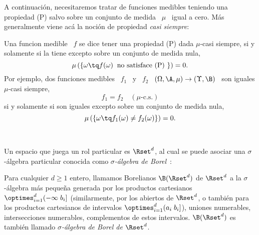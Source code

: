 A  continuaci\'on,  necesitaremos  tratar  de funciones  medibles  teniendo  una
propiedad (P) salvo sobre  un conjunto de medida \ $\mu$ \  igual a cero.  M\'as
generalmente viene ac\'a la noci\'on de propiedad {\it casi siempre}:
%
\begin{definicion}
\label{Def:MP:CasiSiempre}
%
  Una funcion  medible \  $f$ se  dice tener una  propiedad (P)  dada $\mu$-casi
  siempre, si y solamente si la tiene excepto sobre un conjunto de medida nula,
  \[
  \mu\left( \left\{ \omega  \tq f(\omega) \: \mbox{ no  satisface (P) } \right\}
  \right) = 0.
  \]
  Por ejemplo, dos funciones medibles \ $f_1$ \ y \ $f_2$ \ $(\Omega,\A,\mu) \to
  (\Upsilon,\B)$ \ son iguales $\mu$-casi siempre,
  \[
  f_1 = f_2 \quad (\mu\mbox{-c.s.})
  \]
  si y solamente si son iguales excepto sobre un conjunto de medida nula,
  \[
  \mu\left( \left\{ \omega \tq f_1(\omega) \ne f_2(\omega) \right\} \right) = 0.
  \]
\end{definicion}

\

Un espacio  que juega un rol particular  es $\Rset^d$, al cual  se puede asociar
una  $\sigma$-\'algebra  particular  conocida  como {\it  $\sigma$-\'algebra  de
  Borel}~\cite{AshDol99, AthLah06, Bog07:v1, Bog07:v2, Coh13}:
%
\begin{definicion}
\label{Def:MP:Borelianos}
%
  Para  cualquier  $d  \ge  1$  entero,  llamamos  Borelianos  $\B(\Rset^d)$  de
  $\Rset^d$ a  la $\sigma$-\'algebra m\'as peque\~na generada  por los productos
  cartesianos     $\displaystyle    \optimes_{i=1}^d    (-\infty     \;    b_i]$
  \big(similarmente,  por  los  abiertos  de  $\Rset^d$, o  tambi\'en  para  los
  productos  cartesianos de intervalos  $\displaystyle \optimes_{i=1}^d  (a_i \;
  b_i]$\big), \ie uniones numerables, intersecciones numerables, complementos de
  estos intervalos.  $\B(\Rset^d)$  es tambi\'en llamado {\it $\sigma$-\'algebra
    de Borel de $\Rset^d$}.
\end{definicion}

\


